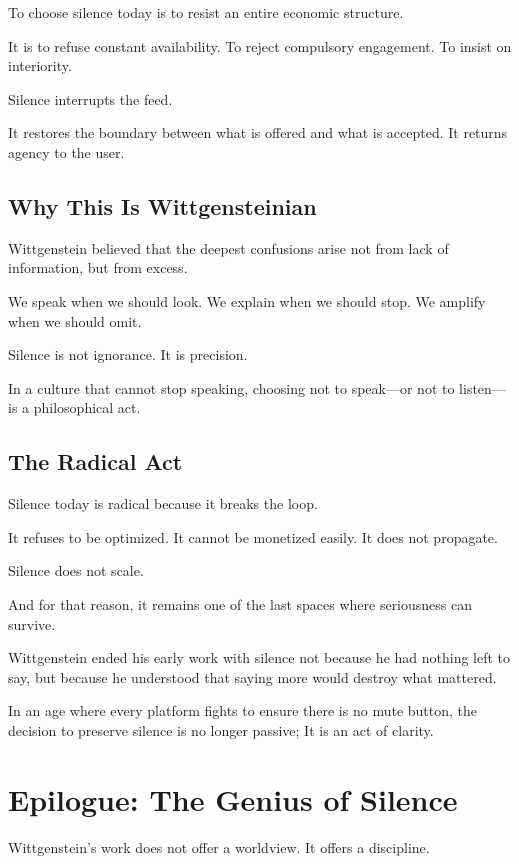\documentclass[11pt]{article}
\begin{document}
To choose silence today is to resist an entire economic structure.

It is to refuse constant availability.  
To reject compulsory engagement.  
To insist on interiority.

Silence interrupts the feed.

It restores the boundary between what is offered and what is accepted. It returns agency to the user.

\subsection*{Why This Is Wittgensteinian}

Wittgenstein believed that the deepest confusions arise not from lack of information, but from excess.

We speak when we should look.  
We explain when we should stop.  
We amplify when we should omit.

Silence is not ignorance. It is precision.

In a culture that cannot stop speaking, choosing not to speak—or not to listen—is a philosophical act.

\subsection*{The Radical Act}

Silence today is radical because it breaks the loop.

It refuses to be optimized.  
It cannot be monetized easily.  
It does not propagate.

Silence does not scale.

And for that reason, it remains one of the last spaces where seriousness can survive.

Wittgenstein ended his early work with silence not because he had nothing left to say, but because he understood that saying more would destroy what mattered.

In an age where every platform fights to ensure there is no mute button, the decision to preserve silence is no longer passive; It is an act of clarity.


\section*{Epilogue: The Genius of Silence}

Wittgenstein’s work does not offer a worldview. It offers a discipline.
\end{document}
